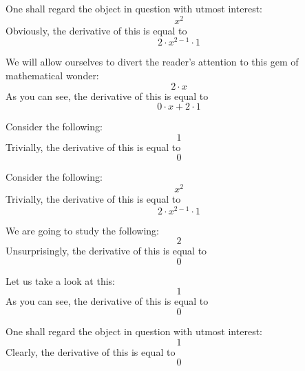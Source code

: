 \documentclass{article}
\begin{document}
One shall regard the object in question with utmost interest:
\begin{equation}
x ^{2 } 
\end{equation}
Obviously, the derivative of this is equal to
\begin{equation}
2 \cdot x ^{2 - 1 } \cdot 1 
\end{equation}

We will allow ourselves to divert the reader's attention to this gem of mathematical wonder:
\begin{equation}
2 \cdot x 
\end{equation}
As you can see, the derivative of this is equal to
\begin{equation}
0 \cdot x + 2 \cdot 1 
\end{equation}

Consider the following:
\begin{equation}
1 
\end{equation}
Trivially, the derivative of this is equal to
\begin{equation}
0 
\end{equation}

Consider the following:
\begin{equation}
x ^{2 } 
\end{equation}
Trivially, the derivative of this is equal to
\begin{equation}
2 \cdot x ^{2 - 1 } \cdot 1 
\end{equation}

We are going to study the following:
\begin{equation}
2 
\end{equation}
Unsurprisingly, the derivative of this is equal to
\begin{equation}
0 
\end{equation}

Let us take a look at this:
\begin{equation}
1 
\end{equation}
As you can see, the derivative of this is equal to
\begin{equation}
0 
\end{equation}

One shall regard the object in question with utmost interest:
\begin{equation}
1 
\end{equation}
Clearly, the derivative of this is equal to
\begin{equation}
0 
\end{equation}
\end{document}
